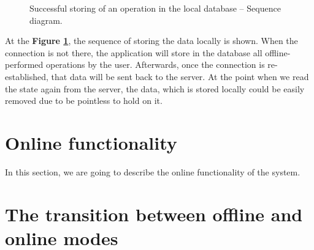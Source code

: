 \begin{figure}[!htb]
    \begin{center}
    \def\svgwidth{\columnwidth}
    
    \caption {Successful storing of an operation in the local database -- Sequence diagram.}
    \label{fig:design7}
\end{center}
\end{figure}

At the \textbf{Figure \ref{fig:design7}}, the sequence of storing the data locally is shown. When the connection is not there, the application will store in the database all offline-performed operations by the user. Afterwards, once the connection is re-established, that data will be sent back to the server. At the point when we read the state again from the server, the data, which is stored locally could be easily removed due to be pointless to hold on it. 


\section {Online functionality}

In this section, we are going to describe the online functionality of the system.



\section {The transition between offline and online modes}